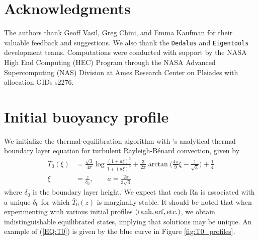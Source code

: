 \documentclass[reprint,amsmath,amssymb,aps]{revtex4-1}
\newcommand\Ra{\mathrm{Ra}}
\newcommand{\eq}[1]{(\ref{#1})}
\begin{document}
\section*{Acknowledgments}
The authors thank Geoff Vasil, Greg Chini, and Emma Kaufman for their valuable feedback and suggestions. 
We also thank the \texttt{Dedalus} and \texttt{Eigentools} development teams. 
Computations were conducted with support by the NASA High End Computing (HEC) Program through the NASA Advanced Supercomputing (NAS) Division at Ames Research Center on Pleiades with allocation GIDs s2276.


\appendix

\section{Initial buoyancy profile} \label{sec:initial_profile}
We initialize the thermal-equilibration algorithm with \cite{Shishkina}'s analytical thermal boundary layer equation for turbulent Rayleigh-B\'enard convection, given by 
\begin{align}
    \bar{T}_0(\xi) &= \frac{\sqrt{3}}{4\pi} \log \frac{(1 + a\xi)^3}{1 + (a\xi)^3} + \frac{3}{2\pi} \arctan \Big( \frac{4\pi}{9}\xi - \frac{1}{\sqrt{3}} \Big) + \frac{1}{4} \nonumber \\
    \xi &= \frac{z}{\delta_0}, \qquad a = \frac{2\pi}{3\sqrt{3}}\label{EQ:T0}
\end{align}
where $\delta_0$ is the boundary layer height. 
We expect that each $\Ra$ is associated with a unique $\delta_0$ for which $\bar{T}_0(z)$ is marginally-stable. 
It should be noted that when experimenting with various initial profiles $(\tanh, \rm{erf}, \rm{etc.})$, we obtain indistinguishable equilibrated states, implying that solutions may be unique. 
An example of \eq{EQ:T0} is given by the blue curve in Figure \ref{fig:T0_profiles}.

\end{document}
